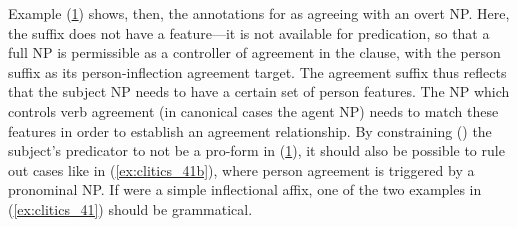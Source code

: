 Example (\ref{ex:clitics_44}) shows, then, the annotations for
 as agreeing with an overt NP. Here, the suffix does
not have a \Pred{} feature---it is not available for predication, so that a
full NP is permissible as a controller of agreement in the clause, with the
person suffix as its person-inflection agreement target. The agreement suffix
 thus reflects that the subject NP needs to have a certain set of
person features. The NP which controls verb agreement (in canonical cases the
agent NP) needs to match these features in order to establish an agreement
relationship. By constraining (\req{}) the subject's predicator to not be a
pro-form in (\ref{ex:clitics_44}), it should also be possible to rule out cases
like in (\ref{ex:clitics_41b}), where person agreement is triggered by a
pronominal NP.
If  were a simple inflectional affix, one of the two
examples in (\ref{ex:clitics_41}) should be grammatical.

\begin{figure}
\begin{morphlex}
\ex\label{ex:clitics_44}
\xe
\end{morphlex}
\end{figure}

